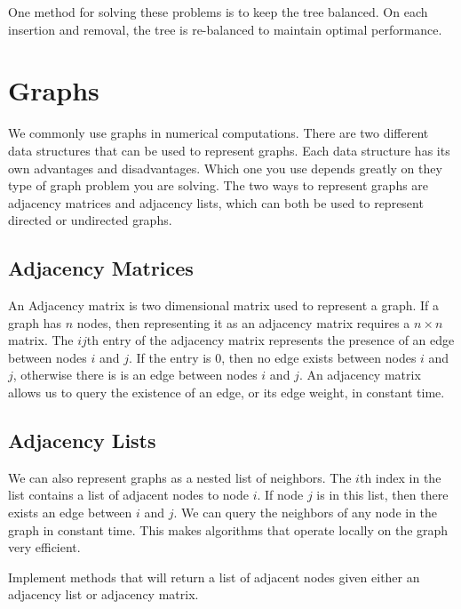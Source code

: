 One method for solving these problems is to keep the tree balanced.
On each insertion and removal, the tree is re-balanced to maintain optimal performance.


\section*{Graphs}
We commonly use graphs in numerical computations.
There are two different data structures that can be used to represent graphs.
Each data structure has its own advantages and disadvantages.
Which one you use depends greatly on they type of graph problem you are solving.
The two ways to represent graphs are adjacency matrices and adjacency lists, which can both
 be used to represent directed or undirected graphs.

\subsection*{Adjacency Matrices}
An Adjacency matrix is two dimensional matrix used to represent a graph.
If a graph has $n$ nodes, then representing it as an adjacency matrix requires a $n \times n$ matrix.
The $ij$th entry of the adjacency matrix represents the presence of an edge between nodes $i$ and $j$.
If the entry is 0, then no edge exists between nodes $i$ and $j$, otherwise there is is an edge between nodes $i$ and $j$.
An adjacency matrix allows us to query the existence of an edge, or its edge weight, in constant time.

\subsection*{Adjacency Lists}
We can also represent graphs as a nested list of neighbors.
The $i$th index in the list contains a list of adjacent nodes to node $i$.
If node $j$ is in this list, then there exists an edge between $i$ and $j$.
We can query the neighbors of any node in the graph in constant time.
This makes algorithms that operate locally on the graph very efficient.

\begin{problem}
Implement methods that will return a list of adjacent nodes given either an adjacency list or adjacency matrix.
\end{problem}


